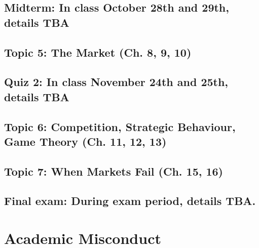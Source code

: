 \documentclass[11pt,]{article}
\begin{document}
\hypertarget{midterm-in-class-october-28th-and-29th-details-tba}{%
\subsection{Midterm: In class October 28th and 29th, details
TBA}\label{midterm-in-class-october-28th-and-29th-details-tba}}

\hypertarget{topic-5-the-market-ch.-8-9-10}{%
\subsection{Topic 5: The Market (Ch. 8, 9,
10)}\label{topic-5-the-market-ch.-8-9-10}}

\hypertarget{quiz-2-in-class-november-24th-and-25th-details-tba}{%
\subsection{Quiz 2: In class November 24th and 25th, details
TBA}\label{quiz-2-in-class-november-24th-and-25th-details-tba}}

\hypertarget{topic-6-competition-strategic-behaviour-game-theory-ch.-11-12-13}{%
\subsection{Topic 6: Competition, Strategic Behaviour, Game Theory (Ch.
11, 12,
13)}\label{topic-6-competition-strategic-behaviour-game-theory-ch.-11-12-13}}

\hypertarget{topic-7-when-markets-fail-ch.-15-16}{%
\subsection{Topic 7: When Markets Fail (Ch. 15,
16)}\label{topic-7-when-markets-fail-ch.-15-16}}

\hypertarget{final-exam-during-exam-period-details-tba.}{%
\subsection{Final exam: During exam period, details
TBA.}\label{final-exam-during-exam-period-details-tba.}}

\newpage

\hypertarget{academic-misconduct}{%
\section{Academic Misconduct}\label{academic-misconduct}}
\end{document}
